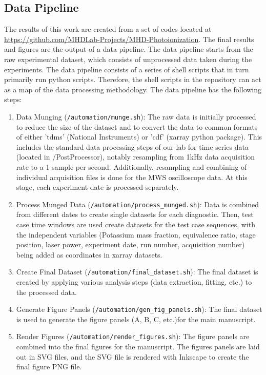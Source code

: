 \clearpage

\subsection{Data Pipeline}

The results of this work are created from a set of codes located at \url{https://github.com/MHDLab-Projects/MHD-Photoionization}. The final results and figures are the output of a data pipeline.  The data pipeline starts from the raw experimental dataset, which consists of unprocessed data taken during the experiments. The data pipeline consists of a series of shell scripts that in turn primarily run python scripts. Therefore, the shell scripts in the repository can act as a map of the data processing methodology. The data pipeline has the following steps: 

\begin{enumerate}
    \item Data Munging (\texttt{/automation/munge.sh}): The raw data is initially processed to reduce the size of the dataset and to convert the data to common formats of either 'tdms' (National Instruments) or 'cdf' (xarray python package). This includes the standard data processing steps of our lab for time series data (located in /PostProcessor), notably resampling from 1kHz data acquisition rate to a 1 sample per second. Additionally, resampling and combining of individual acquisition files is done for the MWS oscilloscope data.  At this stage, each experiment date is processed separately.
    \item Process Munged Data (\texttt{/automation/process\_munged.sh}): Data is combined from different dates to create single datasets for each diagnostic. Then, test case time windows are used create datasets for the test case sequences, with the independent variables (Potassium mass fraction, equivalence ratio, stage position, laser power, experiment date, run number, acquisition number) being added as coordinates in xarray datasets.
    \item Create Final Dataset (\texttt{/automation/final\_dataset.sh}): The final dataset is created by applying various analysis steps (data extraction, fitting, etc.) to the processed data. 
    \item Generate Figure Panels (\texttt{/automation/gen\_fig\_panels.sh}): The final dataset is used to generate the figure panels (A, B, C, etc.)for the main manuscript. 
    \item Render Figures (\texttt{/automation/render\_figures.sh}): The figure panels are combined into the final figures for the manuscript. The figures panels are laid out in SVG files, and the SVG file is rendered with Inkscape to create the final figure PNG file. 
\end{enumerate}

